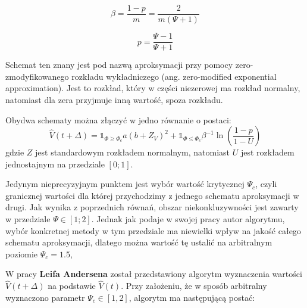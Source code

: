\documentclass{pracamgr}
\begin{document}


\begin{equation}
\label{eq:beta}
\beta = \frac{1-p}{m} = \frac{2}{m(\Psi + 1)}
\end{equation}

\begin{equation}
\label{eq:p}
p = \frac{\Psi - 1}{\Psi + 1}
\end{equation}

Schemat ten znany jest pod nazwą aproksymacji przy pomocy zero-zmodyfikowanego rozkładu wykładniczego (ang. zero-modified exponential approximation). Jest to rozkład, który w części niezerowej ma rozkład normalny, natomiast dla zera przyjmuje inną wartość, spoza rozkładu. 


Obydwa schematy można złączyć w jedno równanie o postaci:
\begin{equation}
\label{eq:andersen}
\hat{V}(t + \Delta)  = \mathbb{1}_{\Phi \geq \Phi_c} a (b + Z_V)^2
 + \mathbb{1}_{\Phi \le \Phi_c} \beta^{-1} \ln (\frac{1-p}{1-U})
\end{equation}
gdzie $Z$ jest standardowym rozkładem normalnym, natomiast $U$ jest rozkładem jednostajnym na przedziale $[0;1]$.


Jedynym nieprecyzyjnym punktem jest wybór wartość krytycznej $\Psi_c$, czyli granicznej wartości dla której przychodzimy z jednego schematu aproksymacji w drugi. 
Jak wynika z poprzednich równań, obszar niekonkluzywności jest zawarty w przedziale $\Psi \in [1;2]$.
Jednak jak podaje w swojej pracy autor algorytmu, wybór konkretnej metody w tym przedziale ma niewielki wpływ na jakość całego schematu aproksymacji, dlatego można wartość tę ustalić na arbitralnym poziomie $\Psi_c = 1.5$,
 


W pracy \textbf{Leifa Andersena} został przedstawiony algorytm wyznaczenia 
wartości $\hat{V}(t + \Delta)$ na podstawie $\hat{V}(t)$. Przy założeniu, 
że w sposób arbitralny wyznaczono parametr $\Psi_c \in [1,2]$, algorytm 
ma następującą postać:
\end{document}
